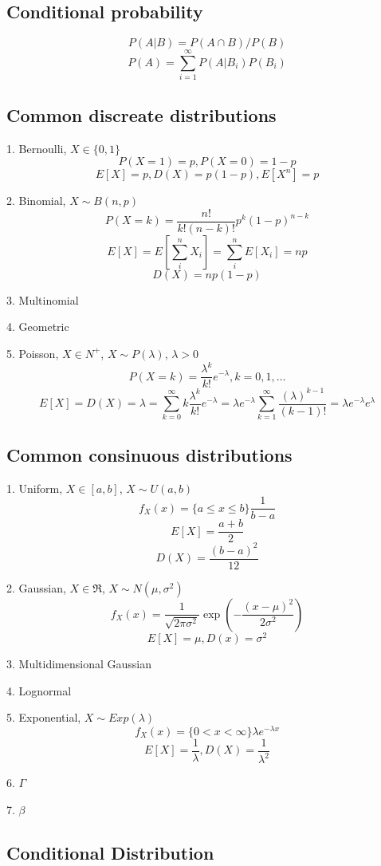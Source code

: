 \subsection{Conditional probability}

$$P(A|B) = P(A\cap B)/P(B)$$
$$P(A) = \sum_{i=1}^\infty P(A|B_i)P(B_i)$$

\subsection{Common discreate distributions}

1. Bernoulli, $X\in \{0, 1\}$
$$P(X=1)=p, P(X=0)=1-p$$
$$E[X]=p, D(X)=p(1-p), E[X^n]=p$$

2. Binomial, $X\sim B(n,p)$
$$P(X=k)=\frac{n!}{k!(n-k)!}p^k(1-p)^{n-k}$$
$$E[X]=E[\sum_i^n X_i]=\sum_i^n E[X_i] = np$$
$$D(X)=np(1-p)$$

3. Multinomial

4. Geometric

5. Poisson, $X\in N^+$, $X\sim P(\lambda)$, $\lambda>0$
$$P(X=k)=\frac{\lambda^k}{k!}e^{-\lambda}, k=0,1,\ldots$$
$$E[X]=D(X)=\lambda = \sum_{k=0}^\infty k \frac{\lambda^k}{k!} e^{-\lambda} = \lambda e^{-\lambda} \sum_{k=1}^\infty \frac{(\lambda)^{k-1}}{(k-1)!} = \lambda e^{-\lambda}e^\lambda$$

\subsection{Common consinuous distributions}

1. Uniform, $X\in [a,b]$, $X\sim U(a,b)$
$$f_X(x)=\{a\leq x\leq b\}\frac{1}{b-a}$$
$$E[X]=\frac{a+b}{2}$$
$$D(X)=\frac{(b-a)^2}{12}$$

2. Gaussian, $X\in \Re$, $X\sim N(\mu,\sigma^2)$
$$f_X(x)=\frac{1}{\sqrt{2\pi\sigma^2}}\exp(-\frac{(x-\mu)^2}{2\sigma^2})$$
$$E[X]=\mu, D(x)=\sigma^2$$

3. Multidimensional Gaussian

4. Lognormal

5. Exponential, $X\sim Exp(\lambda)$
$$f_X(x)=\{0<x<\infty\} \lambda e^{-\lambda x}$$
$$E[X]=\frac{1}{\lambda}, D(X)=\frac{1}{\lambda^2}$$

6. $\Gamma$

7. $\beta$

\subsection{Conditional Distribution}

